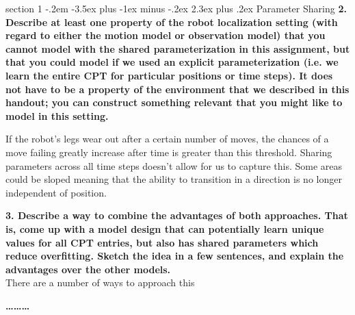 \documentclass[12pt]{article}
\makeatletter
\newenvironment{problem}{\@startsection
       {section}
       {1}
       {-.2em}
       {-3.5ex plus -1ex minus -.2ex}
       {2.3ex plus .2ex}
       {\pagebreak[3]%
       \large\bf\noindent{Problem }
       }
       }
       {%
       \begin{center}\large\bf \ldots\ldots\ldots\end{center}}
\makeatother
\begin{document}
\begin{problem}{Parameter Sharing}
{\bf 2. Describe at least one property of the robot localization setting (with regard
to either the motion model or observation model) that you cannot model with the shared
parameterization in this assignment, but that you could model if we used an explicit
parameterization (i.e. we learn the entire CPT for particular positions or time steps). It
does not have to be a property of the environment that we described in this handout; you
can construct something relevant that you might like to model in this setting. }

If the robot's legs wear out after a certain number of moves, the 
chances of a move failing greatly increase after time is greater than
this threshold.  Sharing parameters across all time steps doesn't allow
for us to capture this. Some areas could be sloped meaning that the ability 
to transition in a direction is no longer independent of position. 

{\bf 3. Describe a way to combine the advantages of both approaches. That is, come
up with a model design that can potentially learn unique values for all CPT entries, but
also has shared parameters which reduce overfitting. Sketch the idea in a few sentences,
and explain the advantages over the other models. }\\

There are a number of ways to approach this 

\end{problem}{}
\end{document}
